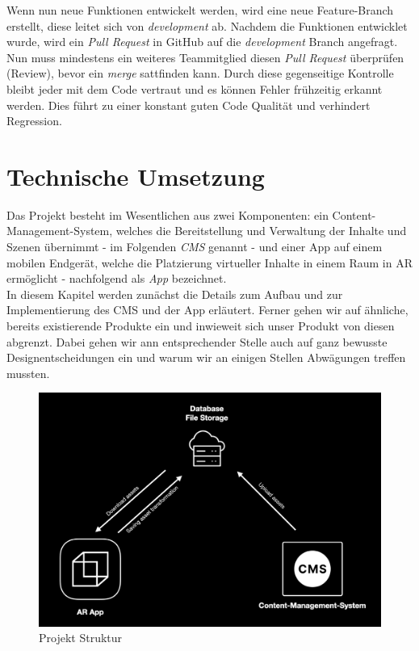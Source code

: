 \documentclass[titlepage, a4paper, 11pt]{scrartcl}
\begin{document}
      Wenn nun neue Funktionen entwickelt werden, wird eine neue Feature-Branch erstellt, diese leitet sich von \textit{development} ab.
      Nachdem die Funktionen entwicklet wurde, wird ein \textit{Pull Request} in GitHub auf die \textit{development} Branch angefragt.
      Nun muss mindestens ein weiteres Teammitglied diesen \textit{Pull Request} überprüfen (Review), bevor ein \textit{merge} sattfinden kann.
      Durch diese gegenseitige Kontrolle bleibt jeder mit dem Code vertraut und es können Fehler frühzeitig erkannt werden.
      Dies führt zu einer konstant guten Code Qualität und verhindert Regression.


  \section{Technische Umsetzung}
  Das Projekt besteht im Wesentlichen aus zwei Komponenten: 
  ein Content-Management-System, welches die Bereitstellung und Verwaltung der Inhalte und Szenen übernimmt - im Folgenden \textit{CMS} genannt -
  und einer App auf einem mobilen Endgerät, welche die Platzierung virtueller Inhalte in einem Raum in AR ermöglicht - nachfolgend als \textit{App} bezeichnet.\\

  In diesem Kapitel werden zunächst die Details zum Aufbau und zur Implementierung des CMS und der App erläutert.
  Ferner gehen wir auf ähnliche, bereits existierende Produkte ein und inwieweit sich unser Produkt von diesen abgrenzt.
  Dabei gehen wir ann entsprechender Stelle auch auf ganz bewusste Designentscheidungen ein und warum wir an einigen Stellen Abwägungen treffen mussten.
  
  \begin{figure}[h]
    \centering
    \includegraphics[width=.6\textwidth]{project-structure}
    \caption{Projekt Struktur}
    \label{ProjektStruktur}
  \end{figure}
\end{document}
